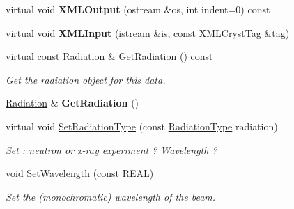 \begin{DoxyCompactItemize}
virtual void {\bfseries X\+M\+L\+Output} (ostream \&os, int indent=0) const
\item 
\mbox{\label{class_obj_cryst_1_1_diffraction_data_single_crystal_ab0e7acf60b2cbeac219dc33aa1ce37b2}} 
virtual void {\bfseries X\+M\+L\+Input} (istream \&is, const X\+M\+L\+Cryst\+Tag \&tag)
\item 
\mbox{\label{class_obj_cryst_1_1_diffraction_data_single_crystal_a86c0187981a9471bd463691f1de6f867}} 
virtual const \mbox{\hyperlink{class_obj_cryst_1_1_radiation}{Radiation}} \& \mbox{\hyperlink{class_obj_cryst_1_1_diffraction_data_single_crystal_a86c0187981a9471bd463691f1de6f867}{Get\+Radiation}} () const
\begin{DoxyCompactList}\small\item\em Get the radiation object for this data. \end{DoxyCompactList}\item 
\mbox{\label{class_obj_cryst_1_1_diffraction_data_single_crystal_a1009e2bf09eef039df76bcdc64807401}} 
\mbox{\hyperlink{class_obj_cryst_1_1_radiation}{Radiation}} \& {\bfseries Get\+Radiation} ()
\item 
\mbox{\label{class_obj_cryst_1_1_diffraction_data_single_crystal_a75578ebb65ee810da7bfb4282c70373b}} 
virtual void \mbox{\hyperlink{class_obj_cryst_1_1_diffraction_data_single_crystal_a75578ebb65ee810da7bfb4282c70373b}{Set\+Radiation\+Type}} (const \mbox{\hyperlink{namespace_obj_cryst_a48fe50a094c607f8897378934d3d73ef}{Radiation\+Type}} radiation)
\begin{DoxyCompactList}\small\item\em Set \+: neutron or x-\/ray experiment ? Wavelength ? \end{DoxyCompactList}\item 
\mbox{\label{class_obj_cryst_1_1_diffraction_data_single_crystal_a19d588f3fd7ca539d89d87e7420438e1}} 
void \mbox{\hyperlink{class_obj_cryst_1_1_diffraction_data_single_crystal_a19d588f3fd7ca539d89d87e7420438e1}{Set\+Wavelength}} (const R\+E\+AL)
\begin{DoxyCompactList}\small\item\em Set the (monochromatic) wavelength of the beam. \end{DoxyCompactList}\item 

\end{DoxyCompactItemize}
